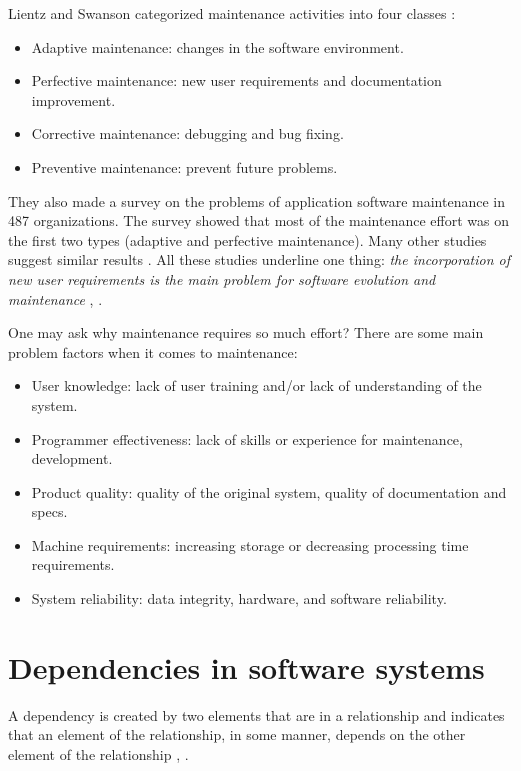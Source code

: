 \documentclass[12pt]{mitthesis}
\begin{document}
Lientz and Swanson categorized maintenance activities into four classes \cite{Lientz:1981:PAS:358790.358796}:
\begin{itemize}
\item Adaptive maintenance: changes in the software environment.
\item Perfective maintenance: new user requirements and documentation improvement.
\item Corrective maintenance: debugging and bug fixing.
\item Preventive maintenance: prevent future problems.
\end{itemize}

They also made a survey on the problems of application software maintenance in 487 organizations. The survey showed that most of the maintenance effort was on the first two types (adaptive and perfective maintenance). Many other studies suggest similar results \cite{Bennett}.
All these studies underline one thing: \textit{the incorporation of new user requirements is the main problem for software evolution and maintenance} \cite{Lientz:1981:PAS:358790.358796}, \cite{Brooks:1987:NSB:26440.26441}.

One may ask why maintenance requires so much effort? There are some main problem factors when it comes to maintenance:

\begin{itemize}
\item User knowledge: lack of user training and/or lack of understanding of the system.
\item Programmer effectiveness: lack of skills or experience for maintenance, development.
\item Product quality: quality of the original system, quality of documentation and specs.
\item Machine requirements: increasing storage or decreasing processing time requirements.
\item System reliability: data integrity, hardware, and software reliability.
\end{itemize}

\chapter{Dependencies in software systems}
A dependency is created by two elements that are in a relationship and indicates that an element of the relationship, in some manner, depends on the other element of the relationship \cite{Booch:2004:OAD:975416}, \cite{Cataldo2009SoftwareDW}.
\end{document}
